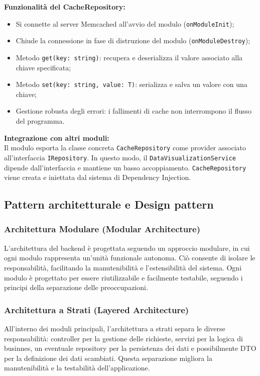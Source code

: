 \textbf{Funzionalità del CacheRepository:}
\begin{itemize}
    \item Si connette al server Memcached all’avvio del modulo (\texttt{onModuleInit});
    \item Chiude la connessione in fase di distruzione del modulo (\texttt{onModuleDestroy});
    \item Metodo \texttt{get(key: string)}: recupera e deserializza il valore associato alla chiave specificata;
    \item Metodo \texttt{set(key: string, value: T)}: serializza e salva un valore con una chiave;
    \item Gestione robusta degli errori: i fallimenti di cache non interrompono il flusso del programma.
\end{itemize}

\textbf{Integrazione con altri moduli:} \\
Il modulo esporta la classe concreta \texttt{CacheRepository} come provider associato all'interfaccia \texttt{IRepository}. In questo modo, il \texttt{DataVisualizationService} dipende dall'interfaccia e mantiene un basso accoppiamento. \texttt{CacheRepository} viene creata e iniettata dal sistema di Dependency Injection.


\subsection{Pattern architetturale e Design pattern}

\subsubsection{Architettura Modulare (Modular Architecture)}
L’architettura del backend è progettata seguendo un approccio modulare, in cui ogni modulo rappresenta un'unità funzionale autonoma. Ciò consente di isolare le responsabilità, facilitando la manutenibilità e l'estensibilità del sistema. Ogni modulo è progettato per essere riutilizzabile e facilmente testabile, seguendo i principi della separazione delle preoccupazioni.

\subsubsection{Architettura a Strati (Layered Architecture)}
All'interno dei moduli principali, l'architettura a strati separa le diverse responsabilità: controller per la gestione delle richieste, servizi per la logica di businnes, un eventuale repository per la persistenza dei dati e possibilmente DTO per la definizione dei dati scambiati. Questa separazione migliora la manutenibilità e la testabilità dell'applicazione.

